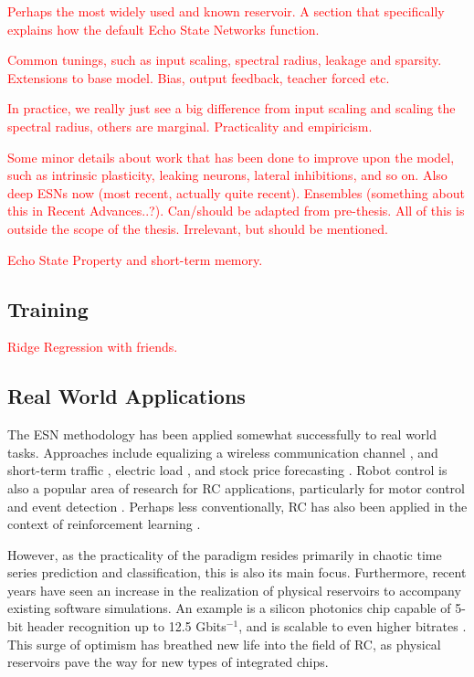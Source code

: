 \textcolor{red}{
  Perhaps the most widely used and known reservoir. A section that specifically
explains how the default Echo State Networks function.
}

\textcolor{red}{
  Common tunings, such as input scaling, spectral radius, leakage and
sparsity. Extensions to base model. Bias, output feedback, teacher forced etc.
}

\textcolor{red}{
  In practice, we really just see a big difference from input scaling and
scaling the spectral radius, others are marginal. Practicality and empiricism.
}

\textcolor{red}{
  Some minor details about work that has been done to improve upon the model,
such as intrinsic plasticity, leaking neurons, lateral inhibitions, and so
on. Also deep ESNs now (most recent, actually quite recent). Ensembles
(something about this in Recent Advances..?). Can/should be adapted from
pre-thesis. All of this is outside the scope of the thesis. Irrelevant, but
should be mentioned.
}

\textcolor{red}{
  Echo State Property and short-term memory.
}

\subsection{Training}

\textcolor{red}{
  Ridge Regression with friends.
}

\subsection{Real World Applications}

The ESN methodology has been applied somewhat successfully to real world
tasks. Approaches include equalizing a wireless communication channel
\cite{jaeger_harnessing_2004}, and short-term traffic \cite{an_short-term_2011},
electric load \cite{song_hourly_2011}, and stock price forecasting
\cite{lin_short-term_2009}. Robot control is also a popular area of research for
RC applications, particularly for motor control and event detection
\cite{aislan_antonelo_learning_2015, harding_evolution_2005,
hutchison_movement_2004}. Perhaps less conventionally, RC has also been applied
in the context of reinforcement learning \cite{bush_modeling_2005}.

However, as the practicality of the paradigm resides primarily in chaotic time
series prediction and classification, this is also its main focus. Furthermore,
recent years have seen an increase in the realization of physical reservoirs to
accompany existing software simulations. An example is a silicon photonics chip
capable of 5-bit header recognition up to 12.5 Gbits$^{-1}$, and is scalable to
even higher bitrates \cite{vandoorne_experimental_2014}. This surge of optimism
has breathed new life into the field of RC, as physical reservoirs pave the way
for new types of integrated chips.

